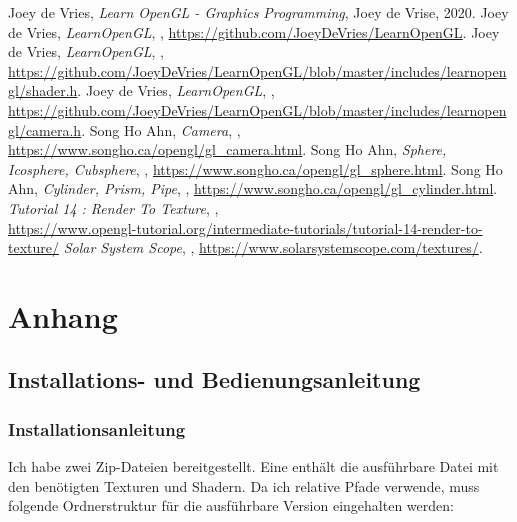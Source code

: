 \documentclass{article}
\let\oldsection\section
\renewcommand\section{\needspace{10\baselineskip}\oldsection}
\let\oldsubsection\subsection
\renewcommand\subsection{\needspace{5\baselineskip}\oldsubsection}
\let\oldsubsubsection\subsubsection
\renewcommand\subsubsection{\needspace{5\baselineskip}\oldsubsubsection}
\begin{document}
\begin{thebibliography}{9}
     Joey de Vries, \textit{Learn OpenGL - Graphics Programming}, Joey de Vrise, 2020.
     Joey de Vries, \textit{LearnOpenGL}, \the\year, \url{https://github.com/JoeyDeVries/LearnOpenGL}.
     Joey de Vries, \textit{LearnOpenGL}, \the\year, \url{https://github.com/JoeyDeVries/LearnOpenGL/blob/master/includes/learnopengl/shader.h}.
     Joey de Vries, \textit{LearnOpenGL}, \the\year, \url{https://github.com/JoeyDeVries/LearnOpenGL/blob/master/includes/learnopengl/camera.h}.
     Song Ho Ahn, \textit{Camera}, \the\year, \url{https://www.songho.ca/opengl/gl_camera.html}.
      Song Ho Ahn, \textit{Sphere, Icosphere, Cubsphere}, \the\year, \url{https://www.songho.ca/opengl/gl_sphere.html}.
     Song Ho Ahn, \textit{Cylinder, Prism, Pipe}, \the\year, \url{https://www.songho.ca/opengl/gl_cylinder.html}.
     \textit{Tutorial 14 : Render To Texture}, \the\year, \\
        \url{https://www.opengl-tutorial.org/intermediate-tutorials/tutorial-14-render-to-texture/}
     \textit{Solar System Scope}, \the\year, \url{https://www.solarsystemscope.com/textures/}.
\end{thebibliography}

\clearpage

\appendix
\renewcommand{\thesubsection}{\Alph{subsection}}
\section*{Anhang}

\subsection{Installations- und Bedienungsanleitung}

\subsubsection*{Installationsanleitung}

Ich habe zwei Zip-Dateien bereitgestellt. 
Eine enthält die ausführbare Datei mit den benötigten Texturen und Shadern.
Da ich relative Pfade verwende, muss folgende Ordnerstruktur für die ausführbare Version eingehalten werden:

\vspace{1em}
\end{document}

